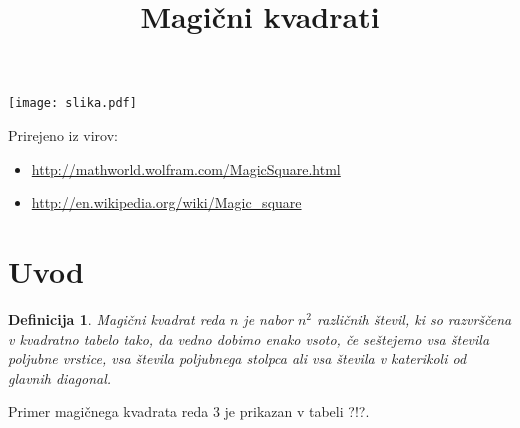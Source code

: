\documentclass[a4paper,12pt]{article}
\title{Magični kvadrati}
\date{}
\author{}
\newtheorem{definicija}{Definicija}}
\begin{document}
\maketitle


\begin{center}
   \texttt{[image: slika.pdf]}
\end{center}

Prirejeno iz virov:

\begin{itemize}
   \item \url{http://mathworld.wolfram.com/MagicSquare.html}
   \item \url{http://en.wikipedia.org/wiki/Magic_square}
\end{itemize}


\tableofcontents


\newpage

\section{Uvod}

\begin{definicija}
   \emph{Magični kvadrat} reda $n$ je nabor $n^2$ različnih števil,
   ki so razvrščena v kvadratno tabelo tako, da vedno dobimo enako vsoto,
   če seštejemo vsa števila poljubne vrstice, vsa števila poljubnega
   stolpca ali vsa števila v katerikoli od glavnih diagonal.
\end{definicija}

Primer magičnega kvadrata reda 3 je prikazan v tabeli ?!?.
\end{document}
